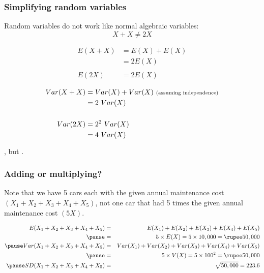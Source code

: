 \documentclass[notes,11pt, aspectratio=169]{beamer}
\begin{document}
\begin{frame}
\frametitle{Simplifying random variables}

Random variables do not work like normal algebraic variables:
\[ X + X \ne 2X \]

\pause

{\small
{}
{
\begin{align*}
E(X + X) &= E(X) + E(X) \\
&= 2 E(X) \\
&~  \\
E(2X) &= 2 E(X) \\
&~ 
\end{align*}
}
{
\begin{align*}
Var(X + X) &= Var(X) + Var(X)~{\scriptsize \text{(assuming independence)}} \\
&= 2~Var(X) \\
&~  \\
Var(2X) &= 2^2~Var(X) \\
&= 4~Var(X)
\end{align*}
}
}


\pause

\vspace{3mm}

, but .

\end{frame}


\begin{frame}
\frametitle{Adding or multiplying?}


\pause

Note that we have 5 cars each with the given annual maintenance cost $(X_1 + X_2 + X_3 + X_4 + X_5)$, not one car that had 5 times the given annual maintenance cost $(5X)$.

\pause

{\small
\begin{eqnarray*} 
E(X_1 + X_2 + X_3 + X_4 + X_5) &=& E(X_1) + E(X_2) + E(X_3) + E(X_4) + E(X_5) \\
\pause
&=& 5 \times E(X) = 5 \times 10,000 = \text{\rupee} 50,000 \\
\pause
Var(X_1 + X_2 + X_3 + X_4 + X_5) &=& Var(X_1) + Var(X_2) + Var(X_3) + Var(X_4) + Var(X_5) \\
\pause
&=& 5 \times V(X) = 5 \times 100^2 = \text{\rupee} 50,000 \\
\pause
SD(X_1 + X_2 + X_3 + X_4 + X_5) &=& \sqrt{50,000} =  223.6
\end{eqnarray*}
}

\end{frame}
\end{document}

